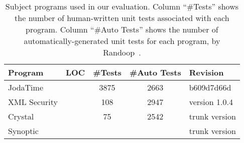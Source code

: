 
\begin{table}
\centering
\setlength{\tabcolsep}{0.4\tabcolsep}
\begin{tabular}{|l|l|c|c|l|}
\hline
\textbf{Program} & \textbf{LOC} & \textbf{\#Tests} & \textbf{\#Auto Tests} & \textbf{Revision}
\\
\hline
JodaTime & & 3875 
& 2663 &  b609d7d66d\\
XML Security & & 108 & 2947 & version 1.0.4 \\ 
Crystal & & 75 & 2542 & trunk version\\
Synoptic & &  & &  trunk version\\ 
\hline
\end{tabular}
\caption{Subject programs used in our evaluation.
Column ``\#Tests'' shows the number of human-written
unit tests associated with each program. Column
``\#Auto Tests'' shows the number of automatically-generated
unit tests for each program, by Randoop~\cite{PachecoLET2007}.
}
\label{tab:subjects}
\end{table}

